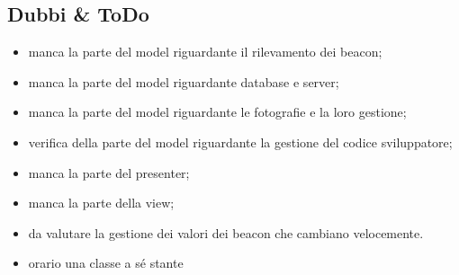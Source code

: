 \documentclass[../SpecificaTecnica.tex]{subfiles}
\begin{document}
	\subsection{Dubbi \& ToDo}
		\begin{itemize}
			\item manca la parte del model riguardante il rilevamento dei beacon;
			\item manca la parte del model riguardante database e server;
			\item manca la parte del model riguardante le fotografie e la loro gestione;
			\item verifica della parte del model riguardante la gestione del codice sviluppatore;
			\item manca la parte del presenter;
			\item manca la parte della view;
			\item da valutare la gestione dei valori dei beacon che cambiano velocemente.
			\item orario una classe a sé stante
		\end{itemize}
\end{document}
